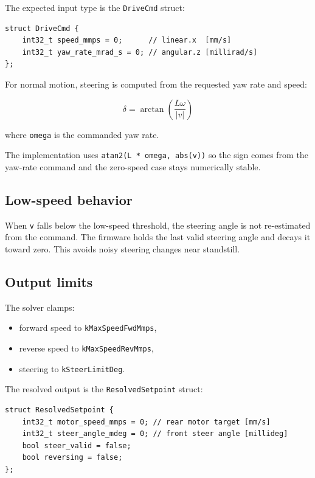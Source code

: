 \documentclass[12pt,a4paper,oneside]{report}
\providecommand{\tightlist}{\setlength{\itemsep}{0pt}\setlength{\parskip}{0pt}}
\begin{document}
The expected input type is the \texttt{DriveCmd} struct:

\begin{verbatim}
struct DriveCmd {
    int32_t speed_mmps = 0;      // linear.x  [mm/s]
    int32_t yaw_rate_mrad_s = 0; // angular.z [millirad/s]
};
\end{verbatim}

For normal motion, steering is computed from the requested yaw rate and speed:

\[
\delta = \arctan\left(\frac{L \omega}{|v|}\right)
\]

where \texttt{omega} is the commanded yaw rate.

The implementation uses \texttt{atan2(L\ *\ omega,\ abs(v))} so the sign comes
from the yaw-rate command and the zero-speed case stays numerically stable.

\subsection{Low-speed behavior}\label{low-speed-behavior}

When \texttt{\textbar{}v\textbar{}} falls below the low-speed threshold, the
steering angle is not re-estimated from the command. The firmware holds the last
valid steering angle and decays it toward zero. This avoids noisy steering
changes near standstill.

\subsection{Output limits}\label{output-limits}

The solver clamps:

\begin{itemize}
\tightlist
\item
  forward speed to \texttt{kMaxSpeedFwdMmps},
\item
  reverse speed to \texttt{kMaxSpeedRevMmps},
\item
  steering to \texttt{kSteerLimitDeg}.
\end{itemize}

The resolved output is the \texttt{ResolvedSetpoint} struct:

\begin{verbatim}
struct ResolvedSetpoint {
    int32_t motor_speed_mmps = 0; // rear motor target [mm/s]
    int32_t steer_angle_mdeg = 0; // front steer angle [millideg]
    bool steer_valid = false;
    bool reversing = false;
};
\end{verbatim}
\end{document}
